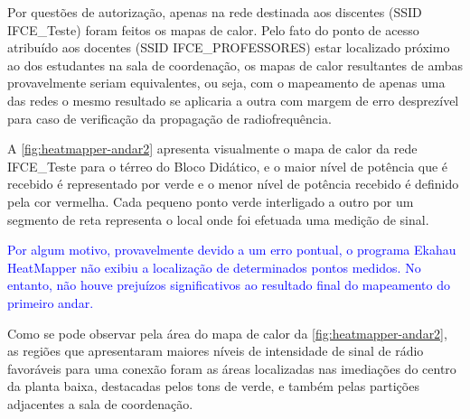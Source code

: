 Por questões de autorização, apenas na rede destinada aos discentes (SSID IFCE\_Teste) foram feitos os mapas de calor. Pelo fato do ponto de acesso atribuído aos docentes (SSID IFCE\_PROFESSORES) estar localizado próximo ao dos estudantes na sala de coordenação, os mapas de calor resultantes de ambas provavelmente seriam equivalentes, ou seja,  com o mapeamento de apenas uma das redes o mesmo resultado se aplicaria a outra com margem de erro desprezível para caso de verificação da propagação de radiofrequência.

A \autoref{fig:heatmapper-andar2} apresenta visualmente o mapa de calor da rede IFCE\_Teste para o térreo do Bloco Didático, e o maior nível de potência que é recebido é representado por verde e o menor nível de potência recebido é definido pela cor vermelha. Cada pequeno ponto verde interligado a outro por um segmento de reta representa o local onde foi efetuada uma medição de sinal.

\textcolor{blue}{Por algum motivo, provavelmente devido a um erro pontual, o programa Ekahau HeatMapper não exibiu a localização de determinados pontos medidos. No entanto, não houve prejuízos significativos ao resultado final do mapeamento do primeiro andar.}

\newpage
\begin{figure}[H]
	\centering
\end{figure}

Como se pode observar pela área do mapa de calor da \autoref{fig:heatmapper-andar2}, as regiões que apresentaram maiores níveis de intensidade de sinal de rádio favoráveis para uma conexão foram as áreas localizadas nas imediações do centro da planta baixa, destacadas pelos tons de verde, e também pelas partições adjacentes a sala de coordenação.

